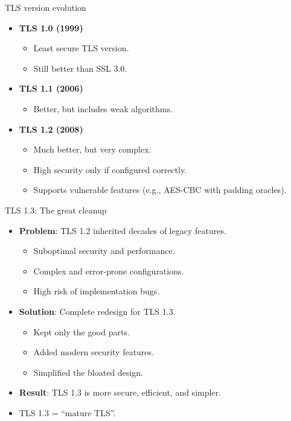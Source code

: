 \documentclass[aspectratio=169, lualatex, handout]{beamer}
\begin{document}
\begin{frame}{TLS version evolution}
	\begin{itemize}
		\item \textbf{TLS 1.0 (1999)}
		      \begin{itemize}
			      \item Least secure TLS version.
			      \item Still better than SSL 3.0.
		      \end{itemize}
		\item \textbf{TLS 1.1 (2006)}
		      \begin{itemize}
			      \item Better, but includes weak algorithms.
		      \end{itemize}
		\item \textbf{TLS 1.2 (2008)}
		      \begin{itemize}
			      \item Much better, but very complex.
			      \item High security only if configured correctly.
			      \item Supports vulnerable features (e.g., AES-CBC with padding oracles).
		      \end{itemize}
	\end{itemize}
\end{frame}

\begin{frame}{TLS 1.3: The great cleanup}
	\begin{itemize}
		\item \textbf{Problem}: TLS 1.2 inherited decades of legacy features.
		      \begin{itemize}
			      \item Suboptimal security and performance.
			      \item Complex and error-prone configurations.
			      \item High risk of implementation bugs.
		      \end{itemize}
		\item \textbf{Solution}: Complete redesign for TLS 1.3.
		      \begin{itemize}
			      \item Kept only the good parts.
			      \item Added modern security features.
			      \item Simplified the bloated design.
		      \end{itemize}
		\item \textbf{Result}: TLS 1.3 is more secure, efficient, and simpler.
		\item TLS 1.3 = ``mature TLS''.
	\end{itemize}
\end{frame}
\end{document}
